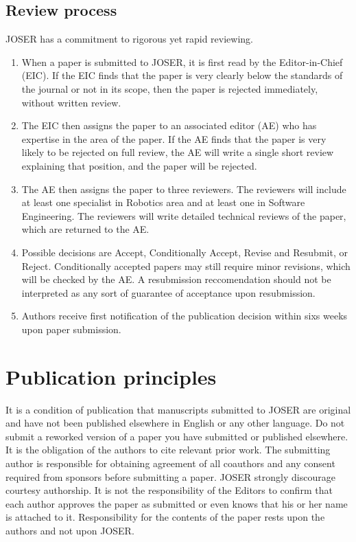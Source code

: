 \documentclass[10pt,journal,compsoc]{joser1}
\begin{document}
\subsection{Review process}
JOSER has a commitment to rigorous yet rapid reviewing.
\begin{enumerate}
   \item When a paper is submitted to JOSER, it is first read by the Editor-in-Chief (EIC). If the EIC finds that the paper is very clearly below the standards of the journal or not in its scope, then the paper is rejected immediately, without written review.
   \item The EIC then assigns the paper to an associated editor (AE) who has expertise in the area of the paper. If the AE finds that the paper is very likely to be rejected on full review, the AE will write a single short review explaining that position, and the paper will be rejected.
   \item The AE then assigns the paper to three reviewers. The reviewers will include at least one specialist in Robotics area and at least one in Software Engineering. The reviewers will write detailed technical reviews of the paper, which are returned to the AE.
   \item Possible decisions are Accept, Conditionally Accept, Revise and Resubmit, or Reject. Conditionally accepted papers may still require minor revisions, which will be checked by the AE. A resubmission reccomendation should not be interpreted as any sort of guarantee of acceptance upon resubmission.
   \item Authors receive first notification of the publication decision within sixs weeks upon paper submission.
\end{enumerate}

\section{Publication principles}
It is a condition of publication that manuscripts submitted to
JOSER are original and have not been published elsewhere in
English or any other language. Do not submit a reworked version of
a paper you have submitted or published elsewhere. It is the obligation of the
authors to cite relevant prior work. The submitting author is
responsible for obtaining agreement of all coauthors and any
consent required from sponsors before submitting a paper. JOSER
strongly discourage courtesy authorship. It is not the
responsibility of the Editors to confirm that
each author approves the paper as submitted or even knows that
his or her name is attached to it. Responsibility for the contents
of the paper rests upon the authors and not upon JOSER.
\end{document}
